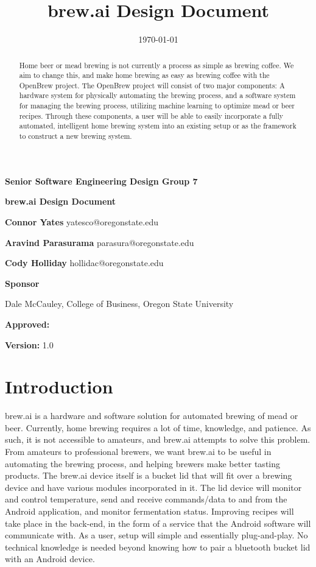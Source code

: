 \documentclass[draftclsnofoot,onecolumn,letterpaper,10pt]{IEEEtran}
\date{\today}
\title{brew.ai Design Document}
\begin{document}
{\huge\textbf{Senior Software Engineering Design Group 7}}
	\vspace{1cm}

{\Huge\textbf{brew.ai Design Document}}

\vspace{2cm}
\textbf{Connor Yates} yatesco@oregonstate.edu

\textbf{Aravind Parasurama} parasura@oregonstate.edu

\textbf{Cody Holliday} hollidac@oregonstate.edu

\vspace{2cm}
\textbf{Sponsor}

Dale McCauley, College of Business, Oregon State University

\vspace{0.5cm}
	\textbf{Approved:} 

	\textbf{Version:} 1.0


\newpage
\begin{abstract}
	Home beer or mead brewing is not currently a process as simple as brewing coffee.
	We aim to change this, and make home brewing as easy as brewing coffee with the OpenBrew project.
	The OpenBrew project will consist of two major components:
	A hardware system for physically automating the brewing process, and a software system for managing the brewing process, utilizing machine learning 
		to optimize mead or beer recipes.
	Through these components, a user will be able to easily incorporate a fully automated, intelligent home brewing system into an existing setup or 
		as the framework to construct a new brewing system.
\end{abstract}
\newpage
\tableofcontents
\newpage
\section{Introduction}
brew.ai is a hardware and software solution for automated brewing of mead or beer. Currently, home brewing requires a lot of time, knowledge, and 
	patience. 
As such, it is not accessible to amateurs, and brew.ai attempts to solve this problem. 
From amateurs to professional brewers, we want brew.ai to be useful in automating the brewing process, and helping brewers make better tasting products. 
The brew.ai device itself is a bucket lid that will fit over a brewing device and have various modules incorporated in it. 
The lid device will monitor and control temperature, send and receive commands/data to and from the Android application, and monitor fermentation status.
Improving recipes will take place in the back-end, in the form of a service that the Android software will communicate with. 
As a user, setup will simple and essentially plug-and-play. 
No technical knowledge is needed beyond knowing how to pair a bluetooth bucket lid with an Android device.
\end{document}
